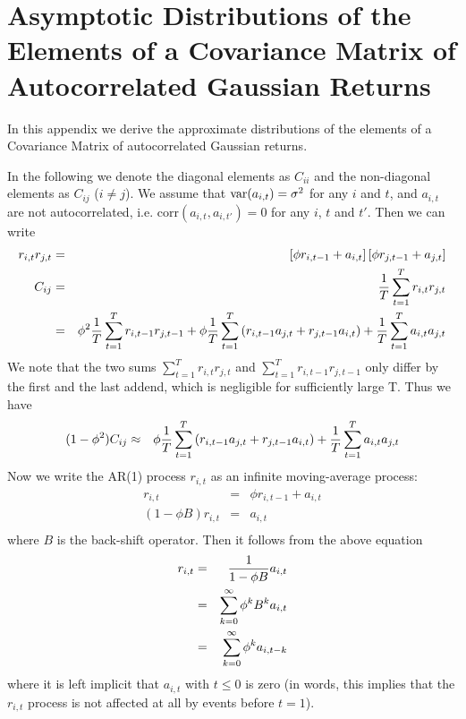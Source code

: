 \chapter{Asymptotic Distributions of the Elements of a Covariance
  Matrix of Autocorrelated Gaussian Returns}
\label{chp:gaussian_elements_dist}
In this appendix we derive the approximate distributions of the
elements of a Covariance Matrix of autocorrelated Gaussian returns.

In the following we denote the diagonal elements as $C_{ii}$ and the
non-diagonal elements as $C_{ij}$ ($i \neq j$). We assume that
$\text{var}(a_{i,t}) = \sigma^2$ for any $i$ and $t$, and $a_{i,t}$ are not
autocorrelated, i.e. $\text{corr}(a_{i,t}, a_{i, t'}) = 0$ for any
$i$, $t$ and $t'$. Then we can write
\begin{eqnarray*}
  r_{i,t} r_{j, t} &=& \left[
    \phi r_{i, t-1} + a_{i, t}
  \right] \left[
    \phi r_{j, t-1} + a_{j, t}
  \right] \\
  C_{ij} &=& {1 \over T}\sum_{t=1}^T r_{i,t} r_{j, t} \\
  &=& \phi^2 {1 \over T}\sum_{t=1}^Tr_{i,t-1} r_{j, t-1} +
  \phi{1 \over T}\sum_{t=1}^T\left(
    r_{i, t-1} a_{j, t} + r_{j, t-1} a_{i, t}
  \right) + {1 \over T}\sum_{t=1}^T a_{i,t} a_{j,t}
\end{eqnarray*}
We note that the two sums $\sum_{t=1}^T r_{i,t} r_{j, t}$ and
$\sum_{t=1}^T r_{i,t-1} r_{j, t-1}$ only differ by the first and the
last addend, which is negligible for sufficiently large T. Thus we
have
\begin{equation}\label{eq:Offdiag1}
  \begin{aligned}
    (1 - \phi^2)C_{ij} &\approx& \phi {1 \over T} \sum_{t=1}^T
    \left(r_{i, t-1} a_{j, t} + r_{j, t-1} a_{i, t} \right)
    + {1 \over T}\sum_{t=1}^T a_{i,t} a_{j,t}
  \end{aligned}
\end{equation}
Now we write the AR(1) process $r_{i,t}$ as an infinite moving-average
process:
\begin{eqnarray*}
  r_{i, t} &=& \phi r_{i, t-1} + a_{i,t} \\
  (1 - \phi B) r_{i, t} &=& a_{i,t} \\
\end{eqnarray*}
where $B$ is the back-shift operator. Then it follows from the above
equation
\begin{eqnarray*}
  r_{i,t} &=& {1 \over 1 - \phi B} a_{i,t} \\
  &=& \sum_{k=0}^\infty \phi^k B^k a_{i,t} \\
  &=& \sum_{k=0}^\infty \phi^k a_{i,t-k} \\
\end{eqnarray*}
where it is left implicit that $a_{i, t}$ with $t \leq 0$ is zero (in
words, this implies that the $r_{i,t}$ process is not affected at all
by events before $t = 1$).

